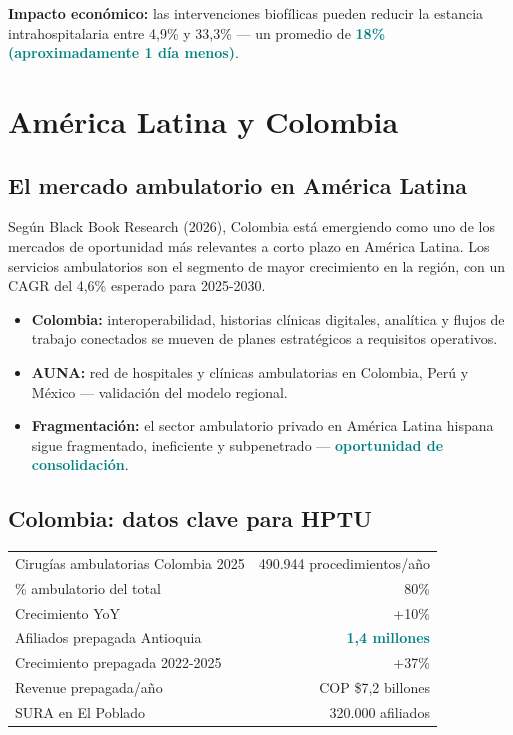 \documentclass[11pt, a4paper]{article}
\newcommand{\highlight}[1]{\textcolor{teal}{\textbf{#1}}}
\newcommand{\fuente}[1]{\par\vspace{2pt}{\scriptsize\textcolor{slate}{Fuente: #1}}}
\begin{document}
\textbf{Impacto econ\'{o}mico:} las intervenciones biof\'{i}licas pueden reducir la estancia intrahospitalaria entre 4,9\% y 33,3\% — un promedio de \highlight{18\% (aproximadamente 1 d\'{i}a menos)}.

\fuente{Frontiers in Public Health 2026, Frontiers in Built Environment 2024, Architecture Adrenaline}

\section{Am\'{e}rica Latina y Colombia}

\subsection{El mercado ambulatorio en Am\'{e}rica Latina}

Seg\'{u}n Black Book Research (2026), Colombia est\'{a} emergiendo como uno de los mercados de oportunidad m\'{a}s relevantes a corto plazo en Am\'{e}rica Latina. Los servicios ambulatorios son el segmento de mayor crecimiento en la regi\'{o}n, con un CAGR del 4,6\% esperado para 2025-2030.

\begin{itemize}
  \item \textbf{Colombia:} interoperabilidad, historias cl\'{i}nicas digitales, anal\'{i}tica y flujos de trabajo conectados se mueven de planes estrat\'{e}gicos a requisitos operativos.
  \item \textbf{AUNA:} red de hospitales y cl\'{i}nicas ambulatorias en Colombia, Per\'{u} y M\'{e}xico — validaci\'{o}n del modelo regional.
  \item \textbf{Fragmentaci\'{o}n:} el sector ambulatorio privado en Am\'{e}rica Latina hispana sigue fragmentado, ineficiente y subpenetrado — \highlight{oportunidad de consolidaci\'{o}n}.
\end{itemize}

\subsection{Colombia: datos clave para HPTU}

\begin{center}
\begin{tabular}{@{}lr@{}}
\toprule
Cirug\'{i}as ambulatorias Colombia 2025 & 490.944 procedimientos/a\~{n}o \\
\% ambulatorio del total & 80\% \\
Crecimiento YoY & +10\% \\
Afiliados prepagada Antioquia & \highlight{1,4 millones} \\
Crecimiento prepagada 2022-2025 & +37\% \\
Revenue prepagada/a\~{n}o & COP \$7,2 billones \\
SURA en El Poblado & 320.000 afiliados \\
\bottomrule
\end{tabular}
\end{center}
\end{document}
